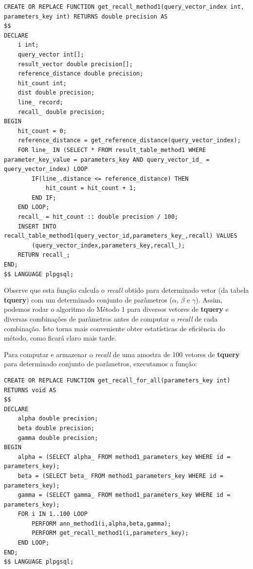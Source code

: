 \documentclass[a4paper,12pt,titlepage]{scrartcl}
\begin{document}
\begin{lstlisting}[caption = Calculando o \emph{recall} no Método 1., label = recallfunc]
CREATE OR REPLACE FUNCTION get_recall_method1(query_vector_index int, parameters_key int) RETURNS double precision AS
$$
DECLARE
	i int;
	query_vector int[];
	result_vector double precision[];
	reference_distance double precision;
	hit_count int;
	dist double precision;
	line_ record;
	recall_ double precision;
BEGIN
	hit_count = 0;
	reference_distance = get_reference_distance(query_vector_index);
	FOR line_ IN (SELECT * FROM result_table_method1 WHERE parameter_key_value = parameters_key AND query_vector_id_ = query_vector_index) LOOP
		IF(line_.distance <= reference_distance) THEN
			hit_count = hit_count + 1;
		END IF;
	END LOOP;
	recall_ = hit_count :: double precision / 100;
	INSERT INTO recall_table_method1(query_vector_id,parameters_key_,recall) VALUES
		(query_vector_index,parameters_key,recall_);
	RETURN recall_;
END;
$$ LANGUAGE plpgsql;

\end{lstlisting}
\vspace{5mm}

Observe que esta função calcula o \emph{recall} obtido para determinado vetor (da tabela \textbf{tquery}) com um determinado conjunto de parâmetros ($\alpha$, $\beta$ e $\gamma$). Assim, podemos rodar o algoritmo do Método 1 para diversos vetores de \textbf{tquery} e diversas combinações de parâmetros antes de computar o \emph{recall} de cada combinação. Isto torna mais conveniente obter estatísticas de eficiência do método, como ficará claro mais tarde. 

Para computar e armazenar o \emph{recall} de uma amostra de 100 vetores de \textbf{tquery} para determinado conjunto de parâmetros, executamos a função:\\

\begin{lstlisting}[caption = Computando o \emph{recall} para todos os vetores de \textbf{tquery}., label = recalltodos1]
CREATE OR REPLACE FUNCTION get_recall_for_all(parameters_key int) RETURNS void AS
$$
DECLARE
	alpha double precision;
	beta double precision;
	gamma double precision;
BEGIN
	alpha = (SELECT alpha_ FROM method1_parameters_key WHERE id = parameters_key);
	beta = (SELECT beta_ FROM method1_parameters_key WHERE id = parameters_key);
	gamma = (SELECT gamma_ FROM method1_parameters_key WHERE id = parameters_key);
	FOR i IN 1..100 LOOP
		PERFORM ann_method1(i,alpha,beta,gamma);
		PERFORM get_recall_method1(i,parameters_key);
	END LOOP;
END;
$$ LANGUAGE plpgsql;

\end{lstlisting}
\vspace{5mm}
\end{document}
